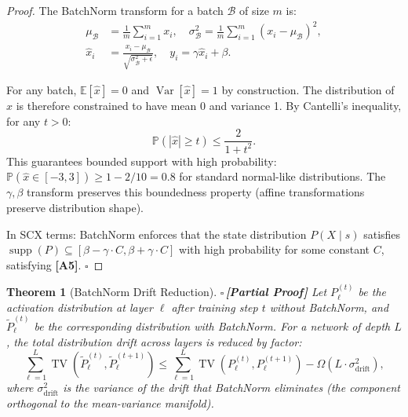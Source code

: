 \documentclass[12pt,a4paper]{article}
\newtheorem{theorem}{Theorem}[section]
\theoremstyle{definition}
\newcommand{\rigorPartial}{{\color{rigorcolor}$\square$\,\textbf{[Partial Proof]}}}
\newcommand{\SCX}{\textsc{SCX}}
\DeclareMathOperator{\TV}{TV}
\DeclareMathOperator{\Var}{Var}
\DeclareMathOperator{\supp}{supp}
\newcommand{\E}{\mathbb{E}}
\newcommand{\Pbb}{\mathbb{P}}
\newcommand{\abs}[1]{\left|#1\right|}
\newcommand{\asmTag}[1]{\textsf{\textbf{[A#1]}}}
\begin{document}
\begin{proof}
The BatchNorm transform for a batch $\mathcal{B}$ of size $m$ is:
\begin{align}
    \mu_{\mathcal{B}} &= \frac{1}{m}\sum_{i=1}^m x_i, \quad \sigma_{\mathcal{B}}^2 = \frac{1}{m}\sum_{i=1}^m (x_i - \mu_{\mathcal{B}})^2, \\
    \hat{x}_i &= \frac{x_i - \mu_{\mathcal{B}}}{\sqrt{\sigma_{\mathcal{B}}^2 + \epsilon}}, \quad y_i = \gamma \hat{x}_i + \beta.
\end{align}

For any batch, $\E[\hat{x}] = 0$ and $\Var[\hat{x}] = 1$ by construction. The distribution of $\hat{x}$ is therefore constrained to have mean 0 and variance 1. By Cantelli's inequality, for any $t > 0$:
\begin{equation}
    \Pbb(\abs{\hat{x}} \ge t) \le \frac{2}{1 + t^2}.
\end{equation}
This guarantees bounded support with high probability: $\Pbb(\hat{x} \in [-3, 3]) \ge 1 - 2/10 = 0.8$ for standard normal-like distributions. The $\gamma, \beta$ transform preserves this boundedness property (affine transformations preserve distribution shape).

In \SCX{} terms: BatchNorm enforces that the state distribution $P(X \mid s)$ satisfies $\supp(P) \subseteq [\beta - \gamma \cdot C, \beta + \gamma \cdot C]$ with high probability for some constant $C$, satisfying \asmTag{5}. \hfill $\square$
\end{proof}

\begin{theorem}[BatchNorm Drift Reduction]\label{thm:bn_drift}
\rigorPartial
Let $P_\ell^{(t)}$ be the activation distribution at layer $\ell$ after training step $t$ without BatchNorm, and $\tilde{P}_\ell^{(t)}$ be the corresponding distribution with BatchNorm. For a network of depth $L$, the total distribution drift across layers is reduced by factor:
\begin{equation}\label{eq:bn_drift_reduction}
    \sum_{\ell=1}^L \TV(\tilde{P}_\ell^{(t)}, \tilde{P}_\ell^{(t+1)}) \le \sum_{\ell=1}^L \TV(P_\ell^{(t)}, P_\ell^{(t+1)}) - \Omega(L \cdot \sigma_{\text{drift}}^2),
\end{equation}
where $\sigma_{\text{drift}}^2$ is the variance of the drift that BatchNorm eliminates (the component orthogonal to the mean-variance manifold).
\end{theorem}
\end{document}
